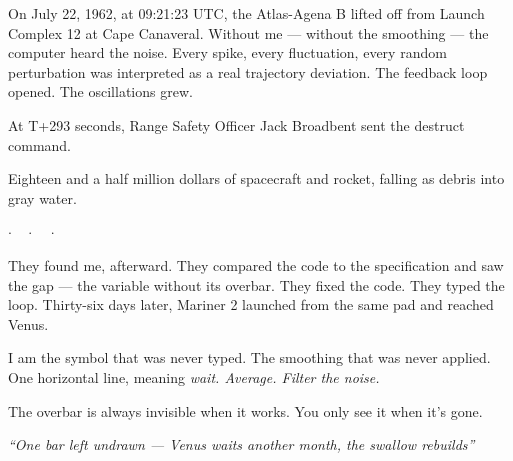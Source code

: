 \documentclass[12pt]{article}
\begin{document}
On July 22, 1962, at 09:21:23 UTC, the Atlas-Agena B lifted off from Launch Complex 12 at Cape Canaveral. Without me --- without the smoothing --- the computer heard the noise. Every spike, every fluctuation, every random perturbation was interpreted as a real trajectory deviation. The feedback loop opened. The oscillations grew.

At T+293 seconds, Range Safety Officer Jack Broadbent sent the destruct command.

Eighteen and a half million dollars of spacecraft and rocket, falling as debris into gray water.

\begin{center}
$\cdot\quad\cdot\quad\cdot$
\end{center}

They found me, afterward. They compared the code to the specification and saw the gap --- the variable without its overbar. They fixed the code. They typed the loop. Thirty-six days later, Mariner 2 launched from the same pad and reached Venus.

I am the symbol that was never typed. The smoothing that was never applied. One horizontal line, meaning \textit{wait. Average. Filter the noise.}

The overbar is always invisible when it works. You only see it when it's gone.

\begin{center}
\textit{``One bar left undrawn --- Venus waits another month, the swallow rebuilds''}
\end{center}
\end{document}
